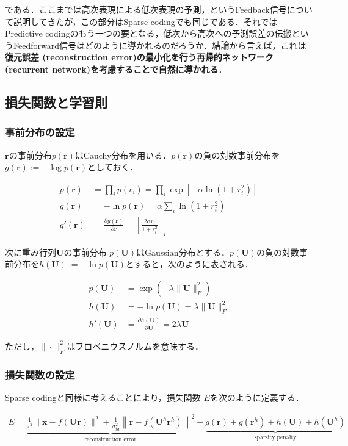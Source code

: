 である．ここまでは高次表現による低次表現の予測，というFeedback信号について説明してきたが，この部分はSparse codingでも同じである．それではPredictive codingのもう一つの要となる，低次から高次への予測誤差の伝搬というFeedforward信号はどのように導かれるのだろうか．結論から言えば，これは\textbf{復元誤差 (reconstruction error)の最小化を行う再帰的ネットワーク (recurrent network)を考慮することで自然に導かれる}．
\subsection{損失関数と学習則}
\subsubsection{事前分布の設定}
$\mathbf{r}$の事前分布$p(\mathbf{r})$はCauchy分布を用いる．$p(\mathbf{r})$の負の対数事前分布を$g(\mathbf{r}):=-\log p(\mathbf{r})$としておく．


\begin{align}
p(\mathbf{r})&=\prod_i p(r_i)=\prod_i \exp\left[-\alpha \ln(1+r_i^2)\right]\\
g(\mathbf{r})&=-\ln p(\mathbf{r})=\alpha \sum_i \ln(1+r_i^2)\\
g'(\mathbf{r})&=\frac{\partial g(\mathbf{r})}{\partial \mathbf{r}}=\left[\frac{2\alpha r_i}{1+r_i^2}\right]_i
\end{align}


次に重み行列$\mathbf{U}$の事前分布 $p(\mathbf{U})$はGaussian分布とする．$p(\mathbf{U})$の負の対数事前分布を$h(\mathbf{U}):=-\ln p(\mathbf{U})$とすると，次のように表される．


\begin{align}
p(\mathbf{U})&=\exp(-\lambda\|\mathbf{U}\|^2_F)\\
h(\mathbf{U})&=-\ln p(\mathbf{U})=\lambda\|\mathbf{U}\|^2_F\\
h'(\mathbf{U})&=\frac{\partial h(\mathbf{U})}{\partial \mathbf{U}}=2\lambda \mathbf{U}
\end{align}


ただし，$\|\cdot \| _ F^2$はフロベニウスノルムを意味する．

\subsubsection{損失関数の設定}
Sparse codingと同様に考えることにより，損失関数 $E$を次のように定義する．


\begin{align}
E=\underbrace{\frac{1}{\sigma^{2}}\|\mathbf{x}-f(\mathbf{U} \mathbf{r})\|^2+\frac{1}{\sigma_{t d}^{2}}\left\|\mathbf{r}-f(\mathbf{U}^h \mathbf{r}^h)\right\|^2}_{\text{reconstruction error}}+\underbrace{g(\mathbf{r})+g(\mathbf{r}^{h})+h(\mathbf{U})+h(\mathbf{U}^h)}_{\text{sparsity penalty}}
\end{align}


